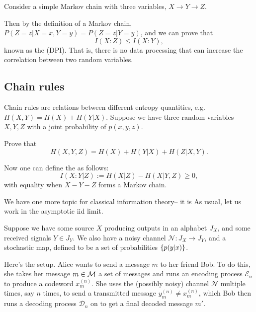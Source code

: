 Consider a simple Markov chain with three variables, $X\to Y \to Z$.

Then by the definition of a Markov chain, $P(Z=z| X=x, Y=y) = P(Z=z| Y=y)$, and we can prove that
\begin{equation}
    I(X:Z) \leq I(X:Y),
\end{equation}
known as the  (DPI). That is, there is no data processing that can increase the correlation between two random variables.

\subsection*{Chain rules} Chain rules are relations between different entropy quantities, e.g. $H(X,Y)=H(X)+ H(Y|X)$. Suppose we have three random variables $X,Y,Z$ with a joint probability of $p(x,y,z)$.
\begin{ex}
    Prove that
    \begin{equation}
        H(X,Y,Z)=H(X) + H(Y|X) + H(Z|X,Y).
    \end{equation}
\end{ex}
\begin{defn}
    Now one can define the  as follows:
    \begin{equation}
        I(X:Y | Z) := H(X|Z) - H(X|Y,Z) \geq 0,
    \end{equation}
    with equality when $X-Y-Z$ forms a Markov chain.
\end{defn}

We have one more topic for classical information theory-- it is  As usual, let us work in the asymptotic iid limit.

Suppose we have some source $X$ producing outputs in an alphabet $J_X$, and some received signals $Y\in J_Y$. We also have a noisy channel $\mathcal{N}:J_X \to J_Y$, and a stochastic map, defined to be a set of probabilities $\{p(y|x)\}$.

Here's the setup. Alice wants to send a message $m$ to her friend Bob. To do this, she takes her message $m\in \mathcal{M}$ a set of messages and runs an encoding process $\mathcal{E}_n$ to produce a codeword $x^{(n)}_m$. She uses the (possibly noisy) channel $\mathcal{N}$ multiple times, say $n$ times, to send a transmitted message $y_m^{(n)}\neq x_m^{(n)}$, which Bob then runs a decoding process $\mathcal{D}_n$ on to get a final decoded message $m'$.

